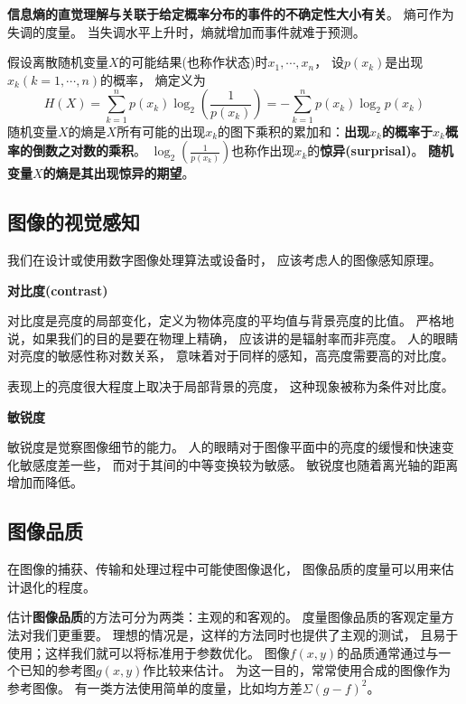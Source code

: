 \textbf{\color{magenta}信息熵的直觉理解与关联于给定概率分布的事件的不确定性大小有关}。%
熵可作为失调的度量。%
当失调水平上升时，熵就增加而事件就难于预测。

假设离散随机变量$X$的可能结果(也称作状态)时$x_{1},\cdots,x_{n}$，%
设$p(x_{k})$是出现$x_{k}(k=1,\cdots,n)$的概率，%
熵定义为
\begin{equation}
  H(X) = \sum_{k=1}^{n}p(x_{k})\log_{2}\left(\frac{1}{p(x_{k})}\right)=-\sum_{k=1}^{n}p(x_{k})\log_{2}p(x_{k})
\end{equation}
随机变量$X$的熵是$X$所有可能的出现$x_{k}$的图下乘积的累加和：\textbf{\color{magenta}出现$x_{k}$的概率于$x_{k}$概率的倒数之对数的乘积}。%
$\log_{2}(\frac{1}{p(x_{k})})$也称作出现$x_{k}$的\textbf{\color{magenta}惊异(surprisal)}。%
\textbf{\color{magenta}随机变量$X$的熵是其出现惊异的期望}。

\subsection{图像的视觉感知}
我们在设计或使用数字图像处理算法或设备时，%
应该考虑人的图像感知原理。%

\noindent\textbf{\color{magenta}对比度(contrast)}\par
对比度是亮度的局部变化，定义为物体亮度的平均值与背景亮度的比值。%
严格地说，如果我们的目的是要在物理上精确，%
应该讲的是辐射率而非亮度。%
人的眼睛对亮度的敏感性称对数关系，%
意味着对于同样的感知，高亮度需要高的对比度。

表现上的亮度很大程度上取决于局部背景的亮度，%
这种现象被称为条件对比度。

\noindent\textbf{\color{magenta}敏锐度}\par
敏锐度是觉察图像细节的能力。%
人的眼睛对于图像平面中的亮度的缓慢和快速变化敏感度差一些，%
而对于其间的中等变换较为敏感。%
敏锐度也随着离光轴的距离增加而降低。

\subsection{图像品质}
在图像的捕获、传输和处理过程中可能使图像退化，%
图像品质的度量可以用来估计退化的程度。

估计\textbf{\color{magenta}图像品质}的方法可分为两类：主观的和客观的。%
度量图像品质的客观定量方法对我们更重要。%
理想的情况是，这样的方法同时也提供了主观的测试，%
且易于使用；这样我们就可以将标准用于参数优化。%
图像$f(x,y)$的品质通常通过与一个已知的参考图$g(x,y)$作比较来估计。%
为这一目的，常常使用合成的图像作为参考图像。%
有一类方法使用简单的度量，比如均方差$\Sigma(g-f)^2$。

